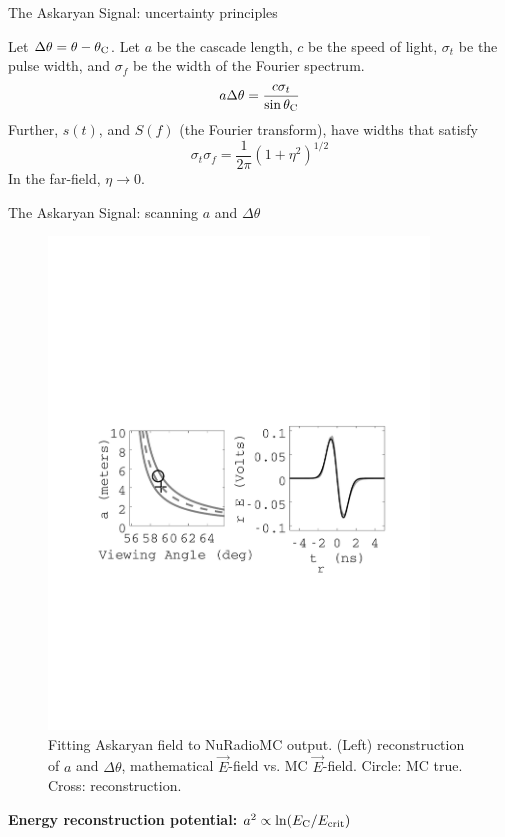 \documentclass{beamer}
\begin{document}
\begin{frame}{The Askaryan Signal: uncertainty principles}
\begin{tcolorbox}[colback=box_background,colframe=box_frame,title={Uncertainty principles within Askaryan field}]
Let $\Delta\theta = \theta - \theta_{\rm C}$.  Let $a$ be the cascade length, $c$ be the speed of light, $\sigma_t$ be the pulse width, and $\sigma_f$ be the width of the Fourier spectrum.
\begin{equation}
a\Delta\theta = \frac{c\sigma_t}{\sin\theta_{\rm C}}
\end{equation}
Further, $s(t)$, and $S(f)$ (the Fourier transform), have widths that satisfy
\begin{equation}
\sigma_t \sigma_f = \frac{1}{2\pi}\left(1+\eta^2\right)^{1/2}
\end{equation}
In the far-field, $\eta \to 0$.
\end{tcolorbox}
\end{frame}

\begin{frame}[fragile]{The Askaryan Signal: scanning $a$ and $\Delta\theta$}
\begin{figure}
\centering
\includegraphics[width=0.9\textwidth,trim=2cm 9cm 2cm 10cm,clip=true]{example_scan.pdf}
\caption{\footnotesize \label{fig:scan} Fitting Askaryan field to NuRadioMC output. (Left) reconstruction of $a$ and $\Delta\theta$, mathematical $\vec{E}$-field vs. MC $\vec{E}$-field.  Circle: MC true.  Cross: reconstruction.}
\end{figure}
\textbf{Energy reconstruction potential:} $a^2 \propto \ln(E_{\rm C}/E_{\rm crit})$
\end{frame}
\end{document}
